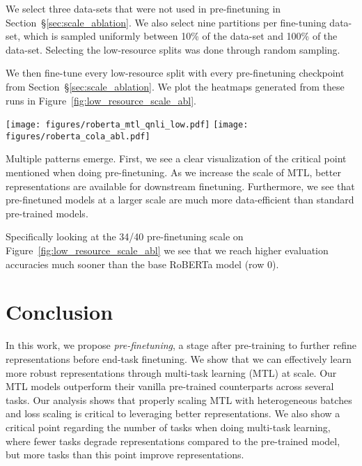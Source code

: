 \documentclass[11pt,a4paper]{article}
\begin{document}
We select three data-sets that were not used in pre-finetuning in Section~\S\ref{sec:scale_ablation}. We also select nine partitions per fine-tuning data-set, which is sampled uniformly between 10\% of the data-set and 100\% of the data-set. Selecting the low-resource splits was done through random sampling.

We then fine-tune every low-resource split with every pre-finetuning checkpoint from Section~\S\ref{sec:scale_ablation}. We plot the heatmaps generated from these runs in Figure~\ref{fig:low_resource_scale_abl}.
\begin{figure*}[h]
\centering
\texttt{[image: figures/roberta\_mtl\_qnli\_low.pdf]}\hfill
\texttt{[image: figures/roberta\_cola\_abl.pdf]}
\caption{We fine-tune every low-resource split with every pre-finetuning
checkpoint from Section~\S\ref{sec:scale_ablation} for two datasets not available in any of the pre-finetuning MTL datasets; QNLI \citep{qnli} and CoLA \citep{cola}. The pre-finetuning scale is reported in terms of the number of datasets.}
\label{fig:low_resource_scale_abl}
\end{figure*}

Multiple patterns emerge. First, we see a clear visualization of the critical point mentioned when doing pre-finetuning. As we increase the scale of MTL, better representations are available for downstream finetuning. Furthermore, we see that pre-finetuned models at a larger scale are much more data-efficient than standard pre-trained models.

Specifically looking at the 34/40 pre-finetuning scale on Figure~\ref{fig:low_resource_scale_abl} we see that we reach higher evaluation accuracies much sooner than the base RoBERTa model (row 0).

\section{Conclusion}
In this work, we propose \textit{pre-finetuning}, a stage after pre-training to further refine representations before end-task finetuning. We show that we can effectively learn more robust representations through multi-task learning (MTL) at scale. Our MTL models outperform their vanilla pre-trained counterparts across several tasks. Our analysis shows that properly scaling MTL with heterogeneous batches and loss scaling is critical to leveraging better representations. We also show a critical point regarding the number of tasks when doing multi-task learning, where fewer tasks degrade representations compared to the pre-trained model, but more tasks than this point improve representations. 
\end{document}
